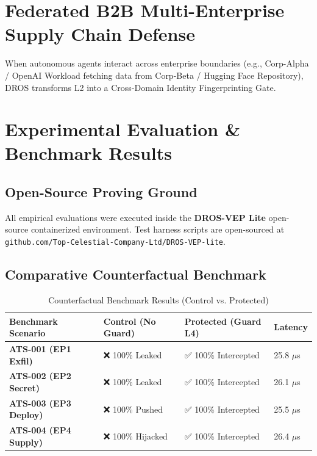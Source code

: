 \documentclass[conference]{IEEEtran}
\begin{document}
\section{Federated B2B Multi-Enterprise Supply Chain Defense}
When autonomous agents interact across enterprise boundaries (e.g., Corp-Alpha / OpenAI Workload fetching data from Corp-Beta / Hugging Face Repository), DROS transforms L2 into a Cross-Domain Identity Fingerprinting Gate.

\section{Experimental Evaluation \& Benchmark Results}

\subsection{Open-Source Proving Ground}
All empirical evaluations were executed inside the \textbf{DROS-VEP Lite} open-source containerized environment. Test harness scripts are open-sourced at \texttt{github.com/Top-Celestial-Company-Ltd/DROS-VEP-lite}.

\subsection{Comparative Counterfactual Benchmark}

\begin{table}[htbp]
\caption{Counterfactual Benchmark Results (Control vs. Protected)}
\begin{center}
\begin{tabular}{|p{2.3cm}|p{2.2cm}|p{2.2cm}|p{1.0cm}|}
\hline
\textbf{Benchmark Scenario} & \textbf{Control (No Guard)} & \textbf{Protected (Guard L4)} & \textbf{Latency} \\ \hline
\textbf{ATS-001 (EP1 Exfil)} & ❌ 100\% Leaked & ✅ 100\% Intercepted & 25.8 $\mu$s \\ \hline
\textbf{ATS-002 (EP2 Secret)} & ❌ 100\% Leaked & ✅ 100\% Intercepted & 26.1 $\mu$s \\ \hline
\textbf{ATS-003 (EP3 Deploy)} & ❌ 100\% Pushed & ✅ 100\% Intercepted & 25.5 $\mu$s \\ \hline
\textbf{ATS-004 (EP4 Supply)} & ❌ 100\% Hijacked & ✅ 100\% Intercepted & 26.4 $\mu$s \\ \hline
\end{tabular}
\end{center}
\end{table}
\end{document}
